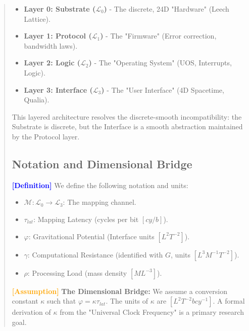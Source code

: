 \documentclass[11pt,titlepage]{article}
\newcommand{\substrate}{\mathcal{L}_0}
\newcommand{\protocol}{\mathcal{L}_1}
\newcommand{\logic}{\mathcal{L}_2}
\newcommand{\interface}{\mathcal{L}_3}
\newcommand{\tagdef}{\textcolor{blue}{\textbf{[Definition]}} }
\newcommand{\tagass}{\textcolor{orange}{\textbf{[Assumption]}} }
\begin{document}
\begin{abstract}
\begin{itemize}
\item \textbf{Layer 0: Substrate ($\substrate$)} - The discrete, 24D "Hardware" (Leech Lattice).
    
\item \textbf{Layer 1: Protocol ($\protocol$)} - The "Firmware" (Error correction, bandwidth laws).
    
\item \textbf{Layer 2: Logic ($\logic$)} - The "Operating System" (UOS, Interrupts, Logic).
    
\item \textbf{Layer 3: Interface ($\interface$)} - The "User Interface" (4D Spacetime, Qualia).
\end{itemize}
This layered architecture resolves the discrete-smooth incompatibility: the Substrate is discrete, but the Interface is a smooth abstraction maintained by the Protocol layer.


\subsection{Notation and Dimensional Bridge}
\tagdef We define the following notation and units:
\begin{itemize}
    
\item $\mathcal{M}: \substrate \to \interface$: The mapping channel.
    
\item $\tau_{lat}$: Mapping Latency (cycles per bit $[cy/b]$).
    
\item $\varphi$: Gravitational Potential (Interface units $[L^2 T^{-2}]$).
    
\item $\gamma$: Computational Resistance (identified with $G$, units $[L^3 M^{-1} T^{-2}]$).
    
\item $\rho$: Processing Load (mass density $[M L^{-3}]$).
\end{itemize}

\tagass \textbf{The Dimensional Bridge:} We assume a conversion constant $\kappa$ such that $\varphi = \kappa \tau_{lat}$. The units of $\kappa$ are $[L^2 T^{-2} b cy^{-1}]$. A formal derivation of $\kappa$ from the "Universal Clock Frequency" is a primary research goal.






\end{abstract}
\end{document}
